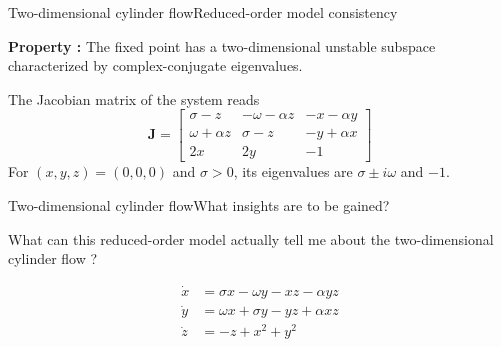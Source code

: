 \documentclass[usenames,dvipsnames,svgnames,10pt,aspectratio=169]{beamer}
\begin{document}
\begin{frame}[t, c]{Two-dimensional cylinder flow}{Reduced-order model consistency}
  \begin{tcolorbox}[colback=white, colframe=beamer@kthblue]
    \textbf{Property :} The fixed point has a two-dimensional unstable subspace characterized by complex-conjugate eigenvalues.
  \end{tcolorbox}
  
  \bigskip
  
  The Jacobian matrix of the system reads
  \[
  \bm{J} = \begin{bmatrix}
    \sigma - z & -\omega - \alpha z & -x - \alpha y \\
    \omega + \alpha z & \sigma - z & -y + \alpha x\\
    2x & 2y & -1
  \end{bmatrix}
  \]
  For $(x, y, z) = (0, 0, 0)$ and $\sigma > 0$, its eigenvalues are $\sigma \pm i \omega$ and $-1$.
\end{frame}




  




\begin{frame}[t, c]{Two-dimensional cylinder flow}{What insights are to be gained?}
  \begin{minipage}{.68\textwidth}
    \centering
    What can this reduced-order model actually tell me about the two-dimensional cylinder flow ?
  \end{minipage}%
  \hfill
  \begin{minipage}{.28\textwidth}
    \[
    \begin{aligned}
      \dot{x} & = \sigma x - \omega y - xz - \alpha yz\\
      \dot{y} & = \omega x + \sigma y - yz + \alpha xz \\
      \dot{z} & = -z + x^2 + y^2
    \end{aligned}
    \]
  \end{minipage}
\end{frame}
\end{document}
